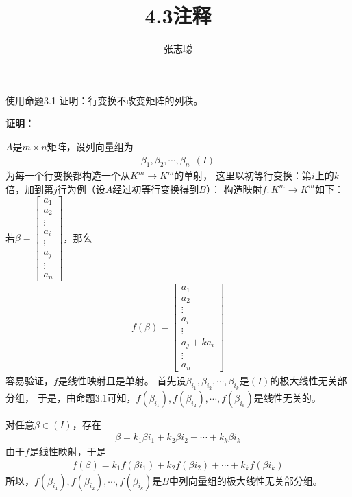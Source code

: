 \documentclass{article}
\begin{document}
\title{4.3注释}
\author{张志聪}
\maketitle

\begin{zremark}
  使用命题3.1 证明：行变换不改变矩阵的列秩。
\end{zremark}

\textbf{证明：}

$A$是$m \times n$矩阵，设列向量组为
\begin{align*}
  \beta_1, \beta_2, \cdots, \beta_n \ \ (I)
\end{align*}
为每一个行变换都构造一个从$K^m \to K^m$的单射，
这里以初等行变换：第$i$上的$k$倍，加到第$j$行为例（设$A$经过初等行变换得到$B$）：
构造映射$f: K^m \to K^m$如下：
若$\beta = \begin{bmatrix}
    a_1    \\
    a_2    \\
    \vdots \\
    a_i    \\
    \vdots \\
    a_j    \\
    \vdots \\
    a_n
  \end{bmatrix}$，那么
\begin{align*}
  f(\beta) = \begin{bmatrix}
               a_1         \\
               a_2         \\
               \vdots      \\
               a_i         \\
               \vdots      \\
               a_j + k a_i \\
               \vdots      \\
               a_n
             \end{bmatrix}
\end{align*}
容易验证，$f$是线性映射且是单射。
首先设$\beta_{i_1}, \beta_{i_2}, \cdots, \beta_{i_k}$是$(I)$的极大线性无关部分组，
于是，由命题3.1可知，$f(\beta_{i_1}), f(\beta_{i_2}), \cdots, f(\beta_{i_k})$是线性无关的。

对任意$\beta \in (I)$，存在
\begin{align*}
  \beta = k_1 \beta{i_1} + k_2 \beta{i_2} + \cdots + k_k \beta{i_k}
\end{align*}
由于$f$是线性映射，于是
\begin{align*}
  f(\beta) = k_1 f(\beta{i_1}) + k_2 f(\beta{i_2}) + \cdots + k_k f(\beta{i_k})
\end{align*}
所以，$f(\beta_{i_1}), f(\beta_{i_2}), \cdots, f(\beta_{i_k})$是$B$中列向量组的极大线性无关部分组。
\end{document}
